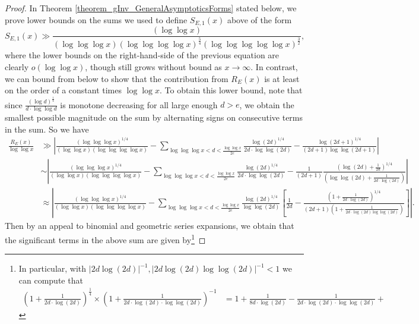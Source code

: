 \documentclass[11pt,reqno,a4letter]{article}
\numberwithin{figure}{section}
\numberwithin{table}{section}
\theoremstyle{plain}
\numberwithin{theorem}{section}
\theoremstyle{definition}
\begin{document}
\begin{proof}
In Theorem \ref{theorem_gInv_GeneralAsymptoticsForms} stated below, 
we prove lower bounds on the sums we used to 
define $S_{E,1}(x)$ above of the form 
\[
S_{E,1}(x) \gg \frac{(\log\log x)}{(\log\log\log x) (\log\log\log\log x)^{\frac{5}{4}} 
     (\log\log\log\log\log x)^{\frac{3}{2}}}, 
\]
where the lower bounds on the right-hand-side of the previous equation are clearly 
$o(\log\log x)$, though still grows without bound as $x \rightarrow \infty$. 
In contrast, we can bound from below to show that the contribution from 
$R_E(x)$ is at least on the order of a constant 
times $\log\log x$. To obtain this lower bound, note that since $\frac{(\log d)^{\frac{1}{4}}}{d \cdot \log\log d}$ 
is monotone decreasing for all large enough $d > e$, we obtain the smallest possible magnitude on the sum 
by alternating signs on consecutive terms in the sum. So we have 
\begin{align*} 
\frac{R_E(x)}{\log\log x} & \gg \left\lvert \frac{(\log\log\log x)^{1/4}}{(\log\log x) (\log\log\log\log x)} - 
     \sum_{\log\log\log x < d < \frac{\log\log x}{2e}} 
     \frac{\log(2d)^{1/4}}{2d \cdot \log\log(2d)} - \frac{\log(2d+1)^{1/4}}{(2d+1) \log\log(2d+1)} 
     \right\rvert \\ 
     & \sim \left\lvert \frac{(\log\log\log x)^{1/4}}{(\log\log x) (\log\log\log\log x)} - 
     \sum_{\log\log\log x < d < \frac{\log\log x}{2e}} 
     \frac{\log(2d)^{1/4}}{2d \cdot \log\log(2d)} - 
     \frac{1}{(2d+1)} \frac{\left(\log(2d) + \frac{1}{2d}\right)^{1/4}}{\left( 
     \log\log(2d) + \frac{1}{2d \cdot \log(2d)}\right)} 
     \right\rvert \\ 
     & \approx \left\lvert \frac{(\log\log\log x)^{1/4}}{(\log\log x) (\log\log\log\log x)} - 
     \sum_{\log\log\log x < d < \frac{\log\log x}{2e}} 
     \frac{\log(2d)^{1/4}}{\log\log(2d)} \left[
     \frac{1}{2d} - 
     \frac{\left(1 + \frac{1}{2d \cdot \log(2d)}\right)^{1/4}}{ 
     (2d+1) \left(1 + \frac{1}{2d \cdot \log(2d) \log\log(2d)}\right)} 
     \right] \right\rvert. 
\end{align*} 
Then by an appeal to binomial and geometric series expansions, we obtain that the significant 
terms in the above sum are given by\footnote{ 
     In particular, with $|2d \log(2d)|^{-1}, |2d \log(2d) \log\log(2d)|^{-1} < 1$ we can compute that 
     \begin{align*} 
     \left(1 + \frac{1}{2d \cdot \log(2d)}\right)^{\frac{1}{4}} \times 
          \left(1 + \frac{1}{2d \cdot \log(2d) \cdot \log\log(2d)}\right)^{-1} & = 
          1 + \frac{1}{8d \cdot \log(2d)} - \frac{1}{2d \cdot \log(2d) \cdot \log\log(2d)} + 

\end{align*}}
\end{proof}
\end{document}

